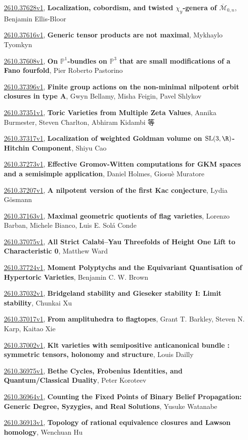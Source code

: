 \documentclass[9pt, a4paper]{article}
\theoremstyle{plain}
\theoremstyle{definition}
\theoremstyle{remark}
\newcommand{\arxiv}[3]{\href{https://arxiv.org/abs/#1}{#1}, \textbf{\textcolor{arxivblue}{#2}}, #3}
\begin{document}
\arxiv{2610.37628v1}{Localization, cobordism, and twisted $χ_y$-genera of $\overline{\mathcal{M}}_{0,n}$}{Benjamin Ellis-Bloor}

\arxiv{2610.37616v1}{Generic tensor products are not maximal}{Mykhaylo Tyomkyn}

\arxiv{2610.37608v1}{On $\mathbb{P}^1$-bundles on $\mathbb{P}^3$ that are small modifications of a Fano fourfold}{Pier Roberto Pastorino}

\arxiv{2610.37396v1}{Finite group actions on the non-minimal nilpotent orbit closures in type A}{Gwyn Bellamy, Misha Feigin, Pavel Shlykov}

\arxiv{2610.37351v1}{Toric Varieties from Multiple Zeta Values}{Annika Burmester, Steven Charlton, Abhiram Kidambi 等}

\arxiv{2610.37317v1}{Localization of weighted Goldman volume on $\mathrm{SL}(3,\R)$-Hitchin Component}{Shiyu Cao}

\arxiv{2610.37273v1}{Effective Gromov-Witten computations for GKM spaces and a semisimple application}{Daniel Holmes, Giosuè Muratore}

\arxiv{2610.37207v1}{A nilpotent version of the first Kac conjecture}{Lydia Gösmann}

\arxiv{2610.37163v1}{Maximal geometric quotients of flag varieties}{Lorenzo Barban, Michele Bianco, Luis E. Solá Conde}

\arxiv{2610.37075v1}{All Strict Calabi--Yau Threefolds of Height One Lift to Characteristic 0}{Matthew Ward}

\arxiv{2610.37724v1}{Moment Polyptychs and the Equivariant Quantisation of Hypertoric Varieties}{Benjamin C. W. Brown}

\arxiv{2610.37032v1}{Bridgeland stability and Gieseker stability I: Limit stability}{Chunkai Xu}

\arxiv{2610.37017v1}{From amplituhedra to flagtopes}{Grant T. Barkley, Steven N. Karp, Kaitao Xie}

\arxiv{2610.37002v1}{Klt varieties with semipositive anticanonical bundle : symmetric tensors, holonomy and structure}{Louis Dailly}

\arxiv{2610.36975v1}{Bethe Cycles, Frobenius Identities, and Quantum/Classical Duality}{Peter Koroteev}

\arxiv{2610.36964v1}{Counting the Fixed Points of Binary Belief Propagation: Generic Degree, Syzygies, and Real Solutions}{Yusuke Watanabe}

\arxiv{2610.36913v1}{Topology of rational equivalence closures and Lawson homology}{Wenchuan Hu}
\end{document}
